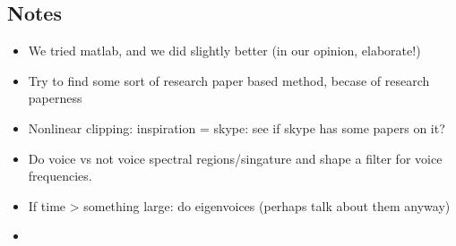 \documentclass[11pt]{article} %
\begin{document}
\subsection{Notes} %
\label{sec:notes}
\begin{itemize}
	\item We tried matlab, and we did slightly better (in our opinion, elaborate!)
	\item Try to find some sort of research paper based method, becase of research paperness
	\item Nonlinear clipping: inspiration = skype: see if skype has some papers on it?
	\item Do voice vs not voice spectral regions/singature and shape a filter for voice frequencies.
	\item If time > something large: do eigenvoices (perhaps talk about them anyway)
	\item 

\end{itemize}
\end{document}
